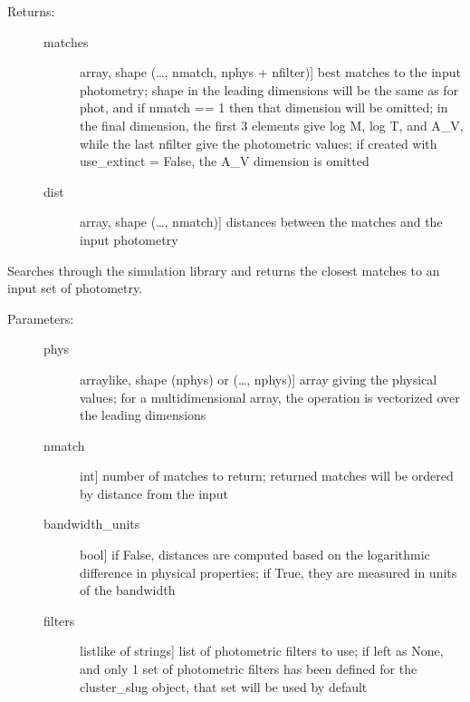 \documentclass[letterpaper,10pt,english]{sphinxmanual}
\begin{document}
\begin{fulllineitems}
\begin{fulllineitems}
\begin{description}
\item[{Returns:}] \leavevmode\begin{description}
\item[{matches}] \leavevmode{[}array, shape (…, nmatch, nphys + nfilter){]}
best matches to the input photometry; shape in the
leading dimensions will be the same as for phot, and if
nmatch == 1 then that dimension will be omitted; in the
final dimension, the first 3 elements give log M, log T,
and A\_V, while the last nfilter give the photometric
values; if created with use\_extinct = False, the A\_V
dimension is omitted

\item[{dist}] \leavevmode{[}array, shape (…, nmatch){]}
distances between the matches and the input photometry

\end{description}

\end{description}

\end{fulllineitems}


\begin{fulllineitems}
\label{\detokenize{cluster_slug:slugpy.cluster_slug.cluster_slug.bestmatch_phys}}
Searches through the simulation library and returns the closest
matches to an input set of photometry.
\begin{description}
\item[{Parameters:}] \leavevmode\begin{description}
\item[{phys}] \leavevmode{[}arraylike, shape (nphys) or (…, nphys){]}
array giving the physical values; for a
multidimensional array, the operation is vectorized over
the leading dimensions

\item[{nmatch}] \leavevmode{[}int{]}
number of matches to return; returned matches will be
ordered by distance from the input

\item[{bandwidth\_units}] \leavevmode{[}bool{]}
if False, distances are computed based on the
logarithmic difference in physical properties; if True,
they are measured in units of the bandwidth

\item[{filters}] \leavevmode{[}listlike of strings{]}
list of photometric filters to use; if left as None, and
only 1 set of photometric filters has been defined for
the cluster\_slug object, that set will be used by
default


\end{description}
\end{description}
\end{fulllineitems}
\end{fulllineitems}
\end{document}
